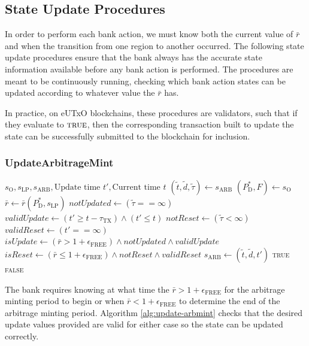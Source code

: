 \documentclass{ifcolog}
\newcommand{\Pdt}{P_{\mathrm{D}}^{*}}
\newcommand{\rr}{\bar{r}}
\newcommand{\slp}{s_{\mathrm{LP}}}
\newcommand{\soracle}{s_{\textrm{O}}}
\newcommand{\sarb}{s_{\textrm{ARB}}}
\newcommand{\tautx}{\tau_{\textrm{TX}}}
\newcommand{\epsilonfree}{\epsilon_{\textrm{FREE}}}
\begin{document}
\newpage

\subsection{State Update Procedures}

In order to perform each bank action, we must know both the current value of $\rr$ and when
the transition from one region to another occurred. The following state update procedures ensure
that the bank always has the accurate state information available before any bank action is performed.
The procedures are meant to be continuously running, checking which bank action states can be updated
according to whatever value the $\rr$ has. 

In practice, on eUTxO \cite{EUTXO} blockchains, these procedures are validators, such that if they evaluate to $\textsc{true}$,
then the corresponding transaction built to update the state can be successfully submitted to the blockchain for inclusion.

\subsubsection{UpdateArbitrageMint}

\begin{algorithm}
\caption{UpdateArbitrageMint}\label{alg:update-arbmint}
\begin{algorithmic}[1]
\Require $\soracle, \slp, \sarb, \textrm{Update time } t', \textrm{Current time } t$
\State $(\tilde{t}, \tilde{d}, \tilde{\tau}) \gets \sarb$
\State $(\Pdt, F) \gets \soracle$
\State $\rr \gets \rr(\Pdt, \slp)$
\State $notUpdated \gets (\tilde{\tau} == \infty)$
\State $validUpdate \gets (t' \ge t - \tautx) \land (t' \le t)$ 
\State $notReset \gets (\tilde{\tau} < \infty)$
\State $validReset \gets (t' == \infty)$
\State $isUpdate \gets (\rr > 1  + \epsilonfree) \land notUpdated \land validUpdate$ 
\State $isReset \gets (\rr \le 1 + \epsilonfree) \land notReset \land validReset$
  \State $\sarb \gets (\tilde{t}, \tilde{d}, t')$
  \State \Return \textsc{true}
\Else
  \State \Return \textsc{false}
\EndIf
\end{algorithmic}
\end{algorithm}

The bank requires knowing at what time the $\rr > 1 + \epsilonfree$ for the arbitrage minting period to begin 
or when $\rr < 1 + \epsilonfree$ to determine the end of the arbitrage minting period. 
Algorithm \ref{alg:update-arbmint} checks that the desired update values provided are valid for either case so the state 
can be updated correctly.
\end{document}

